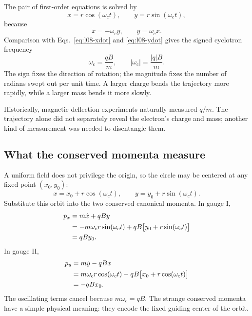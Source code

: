 The pair of first-order equations is solved by
\begin{equation}
 x=r\cos(\omega_c t),
 \qquad y=r\sin(\omega_c t),
\end{equation}
because
\begin{equation}
 \dot x=-\omega_c y,
 \qquad \dot y=\omega_c x.
\end{equation}
Comparison with Eqs.~\eqref{eq:l08-xdot} and \eqref{eq:l08-ydot} gives the
signed cyclotron frequency
\begin{equation}
 \boxed{\omega_c=\frac{qB}{m}},
 \qquad |\omega_c|=\frac{|q|B}{m}.
 \label{eq:l08-cyclotron-frequency}
\end{equation}
The sign fixes the direction of rotation; the magnitude fixes the number of
radians swept out per unit time. A larger charge bends the trajectory more
rapidly, while a larger mass bends it more slowly.

Historically, magnetic deflection experiments naturally measured \(q/m\).
The trajectory alone did not separately reveal the electron's charge and
mass; another kind of measurement was needed to disentangle them.

\begin{classroomqa}
\end{classroomqa}

\subsection{What the conserved momenta measure}

A uniform field does not privilege the origin, so the circle may be centered
at any fixed point \((x_0,y_0)\):
\begin{equation}
 x=x_0+r\cos(\omega_c t),
 \qquad y=y_0+r\sin(\omega_c t).
 \label{eq:l08-shifted-orbit}
\end{equation}
Substitute this orbit into the two conserved canonical momenta. In gauge I,
\begin{align}
 p_x
 &=m\dot x+qBy\notag\\
 &=-m\omega_c r\sin(\omega_c t)
   +qB\bigl[y_0+r\sin(\omega_c t)\bigr]\notag\\
 &=qB y_0.
 \label{eq:l08-px-center}
\end{align}
In gauge II,
\begin{align}
 p_y
 &=m\dot y-qBx\notag\\
 &=m\omega_c r\cos(\omega_c t)
   -qB\bigl[x_0+r\cos(\omega_c t)\bigr]\notag\\
 &=-qB x_0.
 \label{eq:l08-py-center}
\end{align}
The oscillating terms cancel because \(m\omega_c=qB\). The strange conserved
momenta have a simple physical meaning: they encode the fixed guiding center
of the orbit.

